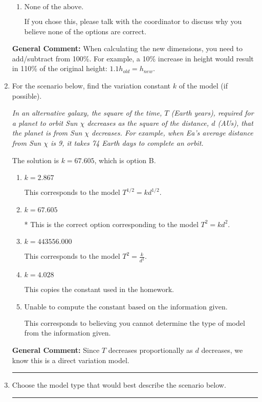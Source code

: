 \documentclass{extbook}[14pt]
\newcommand{\litem}[1]{\item #1

\rule{\textwidth}{0.4pt}}
\begin{document}
\begin{enumerate}
{\begin{enumerate}[label=\Alph*.]
This corresponds to the model: $V = \pi (0.10 r)^2 (0.12 h)$.
\item \( \text{None of the above.} \)

If you chose this, please talk with the coordinator to discuss why you believe none of the options are correct.
\end{enumerate}

\textbf{General Comment:} When calculating the new dimensions, you need to add/subtract from 100\%. For example, a 10\% increase in height would result in 110\% of the original height: $1.1h_{old} = h_{new}$.
}
\litem{
For the scenario below, find the variation constant $k$ of the model (if possible).

\begin{center}
    \textit{ In an alternative galaxy, the square of the time, $T$ (Earth years), required for a planet to orbit Sun $\chi$ decreases as the square of the distance, $d$ (AUs), that the planet is from Sun $\chi$ decreases. For example, when Ea's average distance from Sun $\chi$ is 9, it takes 74 Earth days to complete an orbit. }
\end{center}
The solution is \( k = 67.605 \), which is option B.\begin{enumerate}[label=\Alph*.]
\item \( k = 2.867 \)

This corresponds to the model $T^{1/2} = k d^{1/2}$.
\item \( k = 67.605 \)

* This is the correct option corresponding to the model $T^{2} = k d^{2}$.
\item \( k = 443556.000 \)

This corresponds to the model $T^{2} = \frac{k}{d^{2}}$.
\item \( k = 4.028 \)

This copies the constant used in the homework.
\item \( \text{Unable to compute the constant based on the information given.} \)

This corresponds to believing you cannot determine the type of model from the information given.
\end{enumerate}

\textbf{General Comment:} Since $T$ decreases proportionally as $d$ decreases, we know this is a direct variation model.
}
\litem{
Choose the model type that would best describe the scenario below.

}
\end{enumerate}
\end{document}

